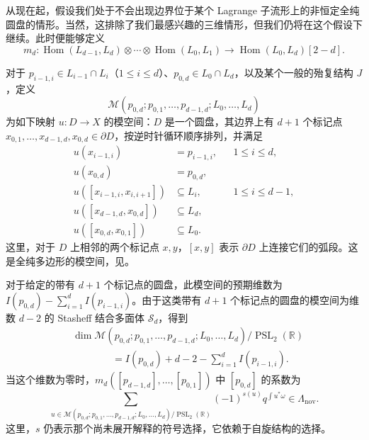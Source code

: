 从现在起，假设我们处于不会出现边界位于某个 Lagrange 子流形上的非恒定全纯圆盘的情形。当然，这排除了我们最感兴趣的三维情形，但我们仍将在这个假设下继续。此时便能够定义
\[
m_d\colon\operatorname{Hom}(L_{d-1},L_d)\otimes\cdots\otimes
\operatorname{Hom}(L_0,L_1)\longrightarrow\operatorname{Hom}(L_0,L_d)[2-d].
\]

对于 $p_{i-1,i}\in L_{i-1}\cap L_i$（$1\leq i\leq d$）、$p_{0,d}\in L_0\cap L_d$，以及某个一般的殆复结构 $J$，定义
\[
\mathcal M(p_{0,d};p_{0,1},\ldots,p_{d-1,d};L_0,\ldots,L_d)
\]
为如下映射 $u\colon D\to X$ 的模空间：$D$ 是一个圆盘，其边界上有 $d+1$ 个标记点 $x_{0,1},\ldots,x_{d-1,d},x_{0,d}\in\partial D$，按逆时针循环顺序排列，并满足
\[
\begin{aligned}
u(x_{i-1,i})&=p_{i-1,i},&&1\leq i\leq d,\\
u(x_{0,d})&=p_{0,d},\\
u([x_{i-1,i},x_{i,i+1}])&\subseteq L_i,&&1\leq i\leq d-1,\\
u([x_{d-1,d},x_{0,d}])&\subseteq L_d,\\
u([x_{0,d},x_{0,1}])&\subseteq L_0.
\end{aligned}
\]
这里，对于 $D$ 上相邻的两个标记点 $x,y$，$[x,y]$ 表示 $\partial D$ 上连接它们的弧段。这是全纯多边形的模空间，见。

\begin{figure}[H]
\centering
{}
\BookNumberOnlyCaption\label{fig:8.20}
\end{figure}

对于给定的带有 $d+1$ 个标记点的圆盘，此模空间的预期维数为 $I(p_{0,d})-\sum_{i=1}^d I(p_{i-1,i})$。由于这类带有 $d+1$ 个标记点的圆盘的模空间为维数 $d-2$ 的 Stasheff 结合多面体 $\mathcal S_d$，得到
\[
\begin{aligned}
&\dim\mathcal M(p_{0,d};p_{0,1},\ldots,p_{d-1,d};L_0,\ldots,L_d)
/\operatorname{PSL}_2(\mathbb R)\\
&\hspace{4em}=I(p_{0,d})+d-2-\sum_{i=1}^d I(p_{i-1,i}).
\end{aligned}
\]
当这个维数为零时，$m_d([p_{d-1,d}],\ldots,[p_{0,1}])$ 中 $[p_{0,d}]$ 的系数为
\[
\sum_{u\in\mathcal M(p_{0,d};p_{0,1},\ldots,p_{d-1,d};L_0,\ldots,L_d)
/\operatorname{PSL}_2(\mathbb R)}
(-1)^{s(u)}q^{\int u^*\omega}\in\Lambda_{\mathrm{nov}}.
\]
这里，$s$ 仍表示那个尚未展开解释的符号选择，它依赖于自旋结构的选择。


